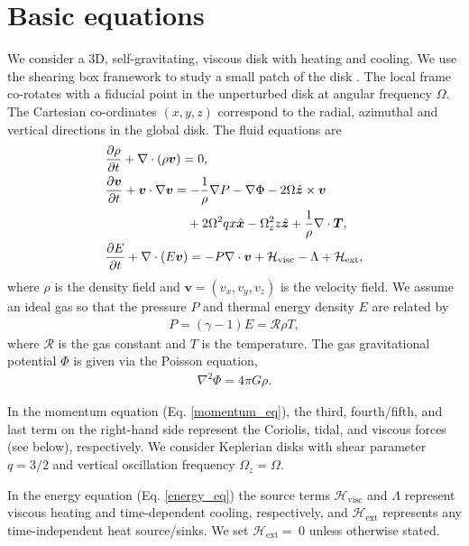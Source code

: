 \section{Basic equations}\label{basic}
We consider a 3D, self-gravitating,
viscous disk with heating and cooling. We use the shearing box framework to
study a small patch of the disk \citep{goldreich65}. The local frame
co-rotates with a fiducial point in the unperturbed disk at angular
frequency $\Omega$. The Cartesian co-ordinates $(x,y,z)$ correspond
to the radial, azimuthal and vertical directions in the global disk. 
The fluid equations are
\begin{align}
  &\frac{\p\rho}{\p t} + \nabla\cdot\left(\rho\bm{v}\right) = 0, \\
  & \frac{\p\bm{v}}{\p t} + \bm{v}\cdot\nabla\bm{v} =
  -\frac{1}{\rho}\nabla P - \nabla\Phi - 2\Omega\hat{\bm{z}}\times\bm{v}\notag\\ & 
  \phantom{\frac{\p\bm{v}}{\p t} + \bm{v}\cdot\nabla\bm{v} =}
  +2\Omega^2qx\hat{\bm{x}} -\Omega_z^2z\hat{\bm{z}} 
   + \frac{1}{\rho}\nabla\cdot\bm{T},\label{momentum_eq}\\
  & \frac{\p E}{\p t} + \nabla\cdot\left(E\bm{v}\right) = - P
  \nabla\cdot\bm{v} + \mathcal{H}_\mathrm{visc} - \Lambda +
  \mathcal{H}_\mathrm{ext} ,\label{energy_eq}
\end{align} 
where $\rho$ is the density field and $\bm{v} = (v_x, v_y, v_z)$ is
the velocity field. 
We assume an ideal gas so that the pressure $P$ and thermal energy
density $E$ are related by  
\begin{align}
  P = (\gamma-1)E = \mathcal{R}\rho T, 
\end{align}
where $\mathcal{R}$ is the gas constant and $T$ is the temperature. The gas 
gravitational potential $\Phi$ is given via the Poisson equation,  
\begin{align}
 \nabla^2\Phi = 4 \pi G \rho. 
\end{align}


In the momentum equation (Eq. \ref{momentum_eq}), the third,
fourth/fifth, and last term on the right-hand side represent the Coriolis, 
tidal, and viscous forces (see below), respectively. We consider    
Keplerian disks with shear parameter $q=3/2$ and vertical oscillation 
frequency $\Omega_z=\Omega$.  

In the energy equation (Eq. \ref{energy_eq}) the source terms 
$\mathcal{H}_\mathrm{visc}$ and $\Lambda$
represent viscous heating and time-dependent cooling, 
respectively, and $\mathcal{H}_\mathrm{ext}$ represents any
time-independent heat source/sinks. We set
$\mathcal{H}_\mathrm{ext}=~0$ unless otherwise stated.  

